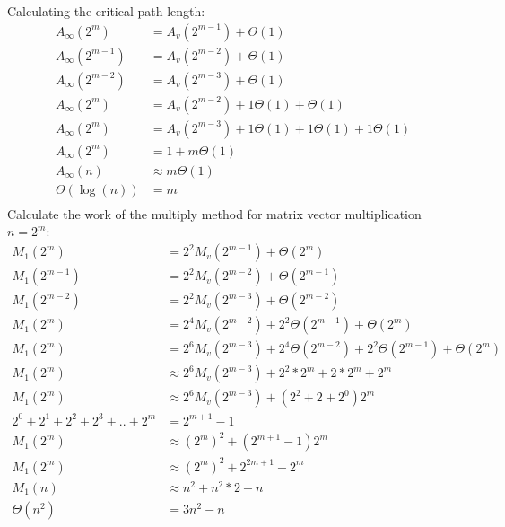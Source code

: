 \documentclass[11pt,letterpaper]{exam}
\begin{document}
\begin{questions}
\begin{parts}
\begin{subparts}
							Calculating the critical path length:
							\begin{align*}
								A_\infty(2^m) &= A_v(2^{m-1}) + \Theta(1)\\
								A_\infty(2^{m-1}) &= A_v(2^{m-2}) + \Theta(1)\\
								A_\infty(2^{m-2}) &= A_v(2^{m-3}) + \Theta(1)\\
								A_\infty(2^m) &= A_v(2^{m-2}) + 1\Theta(1) + \Theta(1)\\
								A_\infty(2^m) &= A_v(2^{m-3}) + 1\Theta(1) + 1\Theta(1) + 1\Theta(1)\\
								A_\infty(2^m) &= 1 + m\Theta(1)\\
								A_\infty(n) &\approx m\Theta(1)\\
								\Theta(\log(n)) &= m\\
							\end{align*}
						\newpage
						\subpart
							Calculate the work of the multiply method for matrix vector multiplication $n = 2^m$:
							\begin{align*}
								M_1(2^m) &= 2^2M_v(2^{m-1}) + \Theta(2^m)\\
								M_1(2^{m-1}) &= 2^2M_v(2^{m-2}) + \Theta(2^{m-1})\\
								M_1(2^{m-2}) &= 2^2M_v(2^{m-3}) + \Theta(2^{m-2})\\
								M_1(2^m) &= 2^4M_v(2^{m-2}) + 2^2\Theta(2^{m-1}) + \Theta(2^m)\\
								M_1(2^m) &= 2^6M_v(2^{m-3}) + 2^4\Theta(2^{m-2}) + 2^2\Theta(2^{m-1}) + \Theta(2^m)\\
								M_1(2^m) &\approx 2^6M_v(2^{m-3}) + 2^2*2^m + 2*2^m + 2^m\\
								M_1(2^m) &\approx 2^6M_v(2^{m-3}) + (2^2 + 2 + 2^0)2^m\\
								2^0+2^1+2^2+2^3+..+2^m &= 2^{m+1}-1\\
								M_1(2^m) &\approx (2^m)^2 + (2^{m+1}-1)2^m\\
								M_1(2^m) &\approx (2^m)^2 + 2^{2m+1}-2^m\\
								M_1(n) &\approx n^2 + n^2*2-n\\
								\Theta(n^2) &= 3n^2-n\\
							\end{align*}


\end{subparts}
\end{parts}
\end{questions}
\end{document}
